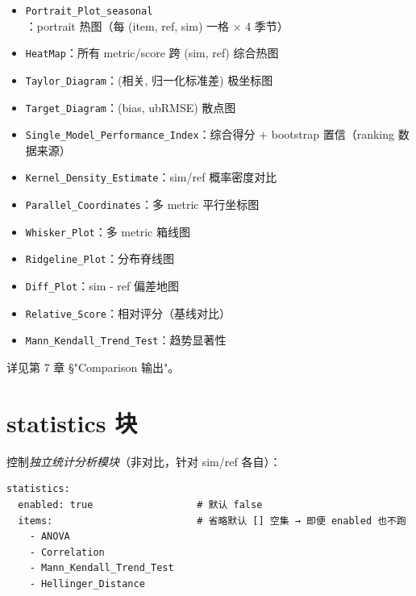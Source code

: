 \begin{itemize}
  \item \texttt{Portrait\_Plot\_seasonal}：portrait 热图（每 (item, ref, sim) 一格 × 4 季节）
  \item \texttt{HeatMap}：所有 metric/score 跨 (sim, ref) 综合热图
  \item \texttt{Taylor\_Diagram}：(相关, 归一化标准差) 极坐标图
  \item \texttt{Target\_Diagram}：(bias, ubRMSE) 散点图
  \item \texttt{Single\_Model\_Performance\_Index}：综合得分 + bootstrap 置信（ranking 数据来源）
  \item \texttt{Kernel\_Density\_Estimate}：sim/ref 概率密度对比
  \item \texttt{Parallel\_Coordinates}：多 metric 平行坐标图
  \item \texttt{Whisker\_Plot}：多 metric 箱线图
  \item \texttt{Ridgeline\_Plot}：分布脊线图
  \item \texttt{Diff\_Plot}：sim - ref 偏差地图
  \item \texttt{Relative\_Score}：相对评分（基线对比）
  \item \texttt{Mann\_Kendall\_Trend\_Test}：趋势显著性
\end{itemize}

详见第 7 章 §"Comparison 输出"。


\section{statistics 块}

 控制\emph{独立统计分析模块}（非对比，针对 sim/ref 各自）：

\begin{verbatim}
statistics:
  enabled: true                  # 默认 false
  items:                         # 省略默认 [] 空集 → 即便 enabled 也不跑
    - ANOVA
    - Correlation
    - Mann_Kendall_Trend_Test
    - Hellinger_Distance
\end{verbatim}


